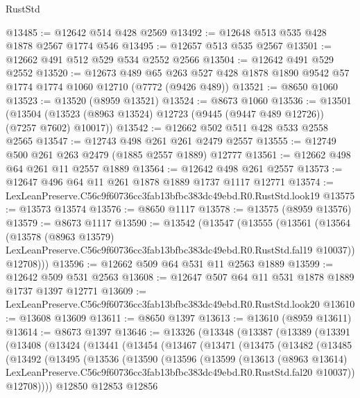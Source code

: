 \begin{lexlean}{RustStd}
\begin{coremodule}
@13485 := @12642 @514 @428 @2569
@13492 := @12648 @513 @535 @428 @1878 @2567 @1774 @546
@13495 := @12657 @513 @535 @2567
@13501 := @12662 @491 @512 @529 @534 @2552 @2566
@13504 := @12642 @491 @529 @2552
@13520 := @12673
    @489
    @65
    @263
    @527
    @428
    @1878
    @1890
    @9542
    @57
    @1774
    @1774
    @1060
    @12710
    (@7772 (@9426 @489))
@13521 := @8650 @1060
@13523 := @13520 (@8959 @13521)
@13524 := @8673 @1060
@13536 := @13501
    (@13504 (@13523 (@8963 @13524) @12723 (@9445 (@9447 @489 @12726)) (@7257 @7602) @10017))
@13542 := @12662 @502 @511 @428 @533 @2558 @2565
@13547 := @12743 @498 @261 @261 @2479 @2557
@13555 := @12749 @500 @261 @263 @2479 (@1885 @2557 @1889) @12777
@13561 := @12662 @498 @64 @261 @11 @2557 @1889
@13564 := @12642 @498 @261 @2557
@13573 := @12647 @496 @64 @11 @261 @1878 @1889 @1737 @1117 @12771
@13574 := LexLeanPreserve.C56c9f60736cc3fab13bfbc383dc49ebd.R0.RustStd.look19
@13575 := @13573 @13574
@13576 := @8650 @1117
@13578 := @13575 (@8959 @13576)
@13579 := @8673 @1117
@13590 := @13542
    (@13547
      (@13555
        (@13561
          (@13564
            (@13578
              (@8963 @13579)
              LexLeanPreserve.C56c9f60736cc3fab13bfbc383dc49ebd.R0.RustStd.fal19
              @10037))
          @12708)))
@13596 := @12662 @509 @64 @531 @11 @2563 @1889
@13599 := @12642 @509 @531 @2563
@13608 := @12647 @507 @64 @11 @531 @1878 @1889 @1737 @1397 @12771
@13609 := LexLeanPreserve.C56c9f60736cc3fab13bfbc383dc49ebd.R0.RustStd.look20
@13610 := @13608 @13609
@13611 := @8650 @1397
@13613 := @13610 (@8959 @13611)
@13614 := @8673 @1397
@13646 := @13326
    (@13348
      (@13387
        (@13389
          (@13391
            (@13408
              (@13424
                (@13441
                  (@13454
                    (@13467
                      (@13471
                        (@13475
                          (@13482
                            (@13485
                              (@13492
                                (@13495
                                  (@13536
                                    (@13590
                                      (@13596
                                        (@13599
                                          (@13613
                                            (@8963 @13614)
                                            LexLeanPreserve.C56c9f60736cc3fab13bfbc383dc49ebd.R0.RustStd.fal20
                                            @10037))
                                        @12708))))
                                @12850
                                @12853
                                @12856

\end{coremodule}
\end{lexlean}
